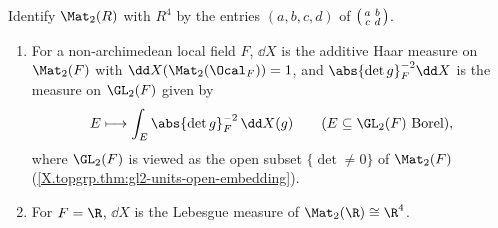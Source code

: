 Identify $\Mat_2(R)$ with $R^4$ by the entries $(a,b,c,d)$ of $\begin{psmallmatrix}a&b\\c&d\end{psmallmatrix}$.
\begin{enumerate}
\item For a non-archimedean local field $F$, $\dd X$ is the additive Haar measure on $\Mat_2(F)$ with
  $\dd X(\Mat_2(\Ocal_F))=1$, and $\abs{\det g}_F^{-2}\dd X$ is the measure on $\GL_2(F)$ given by
  \[
    E\longmapsto\int_E\abs{\det g}_F^{-2}\,\dd X(g)\qquad(E\subseteq\GL_2(F)\text{ Borel}),
  \]
  where $\GL_2(F)$ is viewed as the open subset $\{\det\neq0\}$ of $\Mat_2(F)$
  (\cref{X.topgrp.thm:gl2-units-open-embedding}).
\item For $F=\R$, $\dd X$ is the Lebesgue measure of $\Mat_2(\R)\cong\R^4$.
\end{enumerate}
